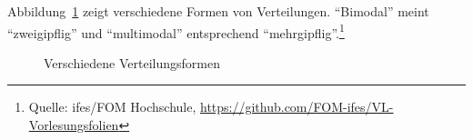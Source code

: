 \documentclass[
  a4paper,
  DIV=11]{scrreprt}
\theoremstyle{definition}
\theoremstyle{definition}
\theoremstyle{definition}
\theoremstyle{remark}
\begin{document}
Abbildung~\ref{fig-plot-distribs} zeigt verschiedene Formen von
Verteilungen. ``Bimodal'' meint ``zweigipflig'' und ``multimodal''
entsprechend ``mehrgipflig''.\footnote{Quelle: ifes/FOM Hochschule,
  \url{https://github.com/FOM-ifes/VL-Vorlesungsfolien}}

\begin{figure}


\caption{\label{fig-plot-distribs}Verschiedene Verteilungsformen}

\end{figure}%
\end{document}
